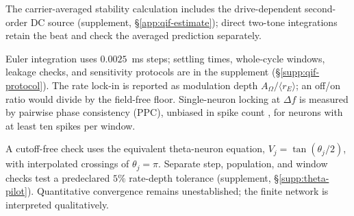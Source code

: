 The carrier-averaged stability calculation includes the drive-dependent second-order DC
source (supplement, \S\ref{app:qif-estimate}); direct two-tone integrations retain the
beat and check the averaged prediction separately.

Euler integration uses $0.0025$~ms steps; settling times, whole-cycle windows, leakage
checks, and sensitivity protocols are in the supplement (\S\ref{supp:qif-protocol}).
The rate lock-in is reported as modulation depth $A_\Omega/\langle r_E\rangle$; an
off/on ratio would divide by the field-free floor. Single-neuron locking at
$\Delta f$ is measured by pairwise phase consistency (PPC), unbiased in spike count
\cite{vinck2010}, for neurons with at least ten spikes per window.

A cutoff-free check uses the equivalent theta-neuron equation,
$V_j=\tan(\theta_j/2)$, with interpolated crossings of $\theta_j=\pi$. Separate step,
population, and window checks test a predeclared $5\%$ rate-depth tolerance
(supplement, \S\ref{supp:theta-pilot}). Quantitative convergence remains unestablished;
the finite network is interpreted qualitatively.
\ifjne\else

\fi

\ifjne\else

\fi

